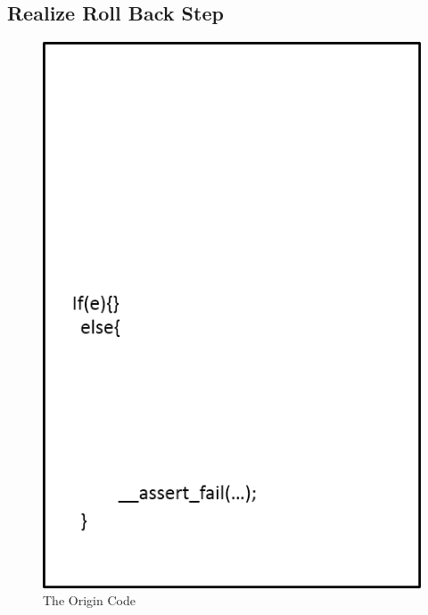\subsection{Realize Roll Back Step}
\begin{figure}
\begin{minipage}[t]{0.48\linewidth}
\centering
\includegraphics[width=\textwidth]{figs/rollback_1.png}
\caption{The Origin Code}
\label {OC}
\end{minipage}%
\begin{minipage}[t]{0.48\linewidth}
\centering

\end{minipage}
\end{figure}
